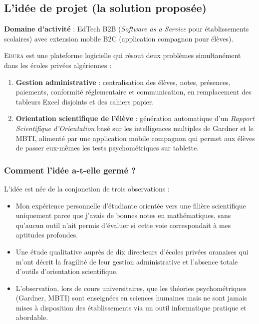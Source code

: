 \documentclass[12pt,a4paper,oneside]{report}
\newcommand{\edura}{\textsc{Edura}}
\begin{document}
\subsection{L'idée de projet (la solution proposée)}

\textbf{Domaine d'activité} : EdTech B2B (\textit{Software as a Service} pour établissements scolaires) avec extension mobile B2C (application compagnon pour élèves).

\edura{} est une plateforme logicielle qui résout deux problèmes simultanément dans les écoles privées algériennes :

\begin{enumerate}
  \item \textbf{Gestion administrative} : centralisation des élèves, notes, présences, paiements, conformité réglementaire et communication, en remplacement des tableurs Excel disjoints et des cahiers papier.
  \item \textbf{Orientation scientifique de l'élève} : génération automatique d'un \textit{Rapport Scientifique d'Orientation} basé sur les intelligences multiples de Gardner et le MBTI, alimenté par une application mobile compagnon qui permet aux élèves de passer eux-mêmes les tests psychométriques sur tablette.
\end{enumerate}

\subsubsection{Comment l'idée a-t-elle germé ?}

L'idée est née de la conjonction de trois observations :

\begin{itemize}
  \item Mon expérience personnelle d'étudiante orientée vers une filière scientifique uniquement parce que j'avais de bonnes notes en mathématiques, sans qu'aucun outil n'ait permis d'évaluer si cette voie correspondait à mes aptitudes profondes.
  \item Une étude qualitative auprès de dix directeurs d'écoles privées oranaises qui m'ont décrit la fragilité de leur gestion administrative et l'absence totale d'outils d'orientation scientifique.
  \item L'observation, lors de cours universitaires, que les théories psychométriques (Gardner, MBTI) sont enseignées en sciences humaines mais ne sont jamais mises à disposition des établissements via un outil informatique pratique et abordable.
\end{itemize}
\end{document}
